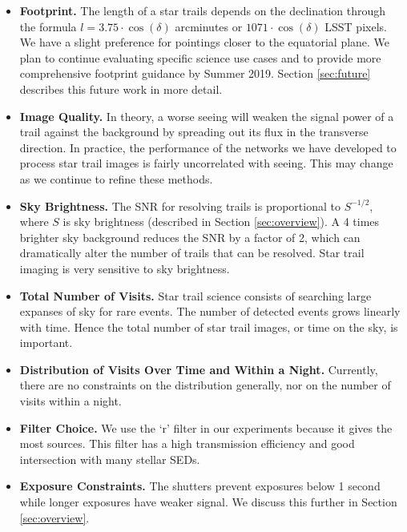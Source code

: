 \documentclass[12pt, letterpaper]{article}
\begin{document}
\begin{itemize}
\item \textbf{Footprint.} The length of a star trails depends on the declination through the formula $l = 3.75 \cdot \cos(\delta)$ arcminutes or $1071 \cdot \cos(\delta)$ LSST pixels. We have a slight preference for pointings closer to the equatorial plane. We plan to continue evaluating specific science use cases and to provide more comprehensive footprint guidance by Summer 2019. Section \ref{sec:future} describes this future work in more detail.

\item \textbf{Image Quality.} In theory, a worse seeing will weaken the signal power of a trail against the background by spreading out its flux in the transverse direction. In practice, the performance of the networks we have developed to process star trail images is fairly uncorrelated with seeing. This may change as we continue to refine these methods.

\item \textbf{Sky Brightness.} The SNR for resolving trails is proportional to $S^{-1/2}$, where $S$ is sky brightness (described in Section \ref{sec:overview}). A 4 times brighter sky background reduces the SNR by a factor of 2, which can dramatically alter the number of trails that can be resolved. Star trail imaging is very sensitive to sky brightness. 

\item \textbf{Total Number of Visits.} Star trail science consists of searching large expanses of sky for rare events. The number of detected events grows linearly with time. Hence the total number of star trail images, or time on the sky, is important.

\item \textbf{Distribution of Visits Over Time and Within a Night.} Currently, there are no constraints on the distribution generally, nor on the number of visits within a night.

\item \textbf{Filter Choice.} We use the `r' filter in our experiments because it gives the most sources. This filter has a high transmission efficiency and good intersection with many stellar SEDs.

\item \textbf{Exposure Constraints.} The shutters prevent exposures below 1 second while longer exposures have weaker signal. We discuss this further in Section \ref{sec:overview}.

\end{itemize}
\end{document}
